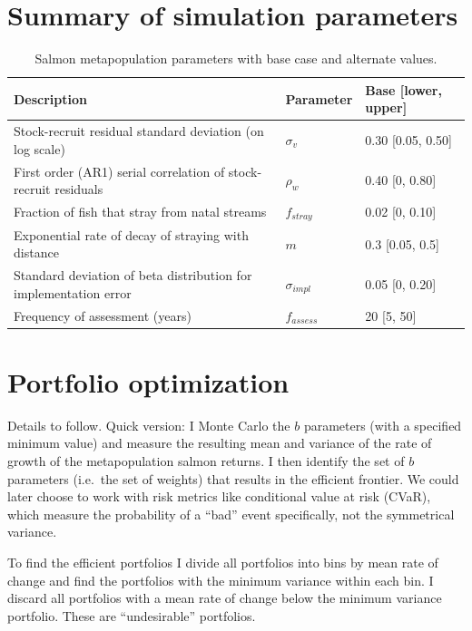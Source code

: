 \documentclass[12pt]{article}
\begin{document}
\section{Summary of simulation parameters}

\begin{table}[h!]
\centering
\small
\caption{Salmon metapopulation parameters with base case and alternate values.}
\begin{tabular}{p{7.0cm}p{1.6cm}p{3.2cm}}
\toprule
Description & Parameter & Base [lower, upper] \\
\midrule
Stock-recruit residual standard deviation (on log scale) & $\sigma_v$ & 0.30 [0.05, 0.50] \\
First order (AR1) serial correlation of stock-recruit residuals & $\rho_w$ & 0.40 [0, 0.80] \\
Fraction of fish that stray from natal streams & $f_{stray}$ & 0.02 [0, 0.10] \\
Exponential rate of decay of straying with distance & $m$ & 0.3 [0.05, 0.5] \\
Standard deviation of beta distribution for implementation error & $\sigma_{impl}$ & 0.05 [0, 0.20] \\
Frequency of assessment (years) & $f_{assess}$ & 20 [5, 50] \\
\bottomrule
\end{tabular}
\label{tab:salm-pars}
\end{table}

\clearpage

\section{Portfolio optimization}

Details to follow. Quick version: I Monte Carlo the $b$ parameters (with
a specified minimum value) and measure the resulting mean and variance
of the rate of growth of the metapopulation salmon returns. I then
identify the set of $b$ parameters (i.e.~the set of weights) that
results in the efficient frontier. We could later choose to work with
risk metrics like conditional value at risk (CVaR), which measure the
probability of a ``bad'' event specifically, not the symmetrical
variance.

To find the efficient portfolios I divide all portfolios into bins by
mean rate of change and find the portfolios with the minimum variance
within each bin. I discard all portfolios with a mean rate of change
below the minimum variance portfolio. These are ``undesirable''
portfolios.
\end{document}
